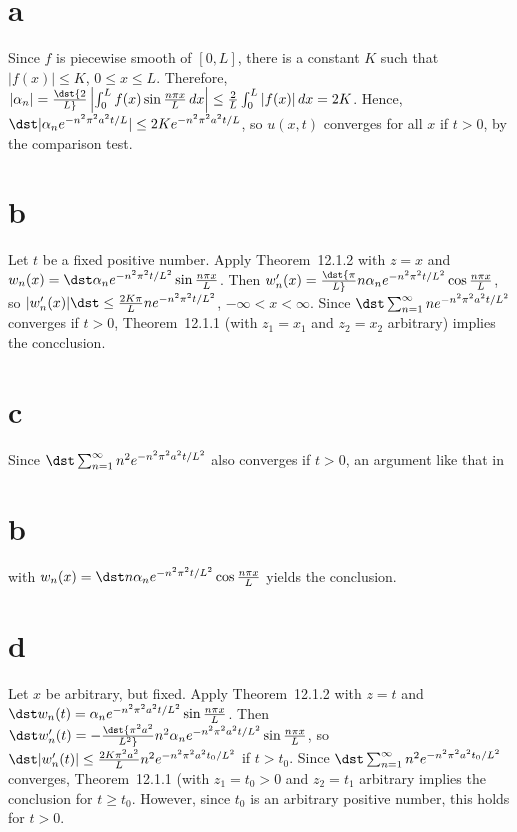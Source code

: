 \documentclass[dvips]{book}
\renewcommand{\exer}[1]{\par\medskip\;\noindent{\color{red}\bf #1.}}
\numberwithin{example}{section}
\numberwithin{equation}{section}
\numberwithin{theorem}{section}
\numberwithin{table}{section}
\numberwithin{figure}{section}
\begin{document}
\exer{12.1.54}
\part{a} Since $f$ is piecewise smooth of $[0,L]$, there is a constant
$K$ such that $|f(x)|\le K$, $0\le x\le L$. Therefore,
$|\alpha_n|=\dst{2\over L}\left|\int_0^Lf(x)\sin{n\pi x\over
L}\,dx\right|\le{2\over L}\int_0^L|f(x)|\,dx=2K$. Hence,
$\dst|\alpha_ne^{-n^2\pi^2a^2t/L}|\le2Ke^{-n^2\pi^2a^2t/L}$,
so $u(x,t)$ converges for all $x$ if $t>0$, by the comparison test.


\part{b}
Let $t$ be a fixed positive number.
Apply Theorem~12.1.2 with $z=x$ and
$w_n(x)=\dst\alpha_ne^{-n^2\pi^2t/L^2}\sin{n\pi x\over L}$.
 Then
$w_n'(x)=\dst{\pi\over L}n\alpha_ne^{-n^2\pi^2t/L^2}\cos{n\pi x\over
L}$,  so
$|w_n'(x)|\dst\le{2K\pi\over L}ne^{-n^2\pi^2t/L^2}$,
$-\infty<x<\infty$.
Since $\dst\sum_{n=1}^\infty ne^{-n^2\pi^2a^2t/L^2}$  converges if
$t>0$,   Theorem~12.1.1 (with
$z_1=x_1$ and
$z_2=x_2$  arbitrary) implies the concclusion.

\part{c}
Since $\dst\sum_{n=1}^\infty n^2e^{-n^2\pi^2a^2t/L^2}$ also converges
if
$t>0$, an argument like that in \part{b} with
$w_n(x)=\dst n\alpha_ne^{-n^2\pi^2t/L^2}\cos{n\pi x\over L}$
yields the conclusion.

\part{d}
Let $x$ be arbitrary, but fixed.
Apply Theorem~12.1.2 with $z=t$ and\\
$\dst w_n(t)=\alpha_ne^{-n^2\pi^2a^2t/L^2}\sin{n\pi x\over L}$.
Then
$\dst w_n'(t)=-\dst{\pi^2a^2\over
L^2}n^2\alpha_ne^{-n^2\pi^2a^2t/L^2}\sin{n\pi x\over L}$,
so
$\dst|w_n'(t)|\le{2K\pi^2a^2\over
L}n^2e^{-n^2\pi^2a^2t_0/L^2}$ if $t>t_0$.
Since $\dst\sum_{n=1}^\infty n^2e^{-n^2\pi^2a^2t_0/L^2}$  converges,
 Theorem~12.1.1 (with $z_1=t_0>0$ and $z_2=t_1$ arbitrary
implies the conclusion for $t\ge t_0$.
However, since $t_0$ is an arbitrary positive number, this holds
for $t>0$.
\end{document}

